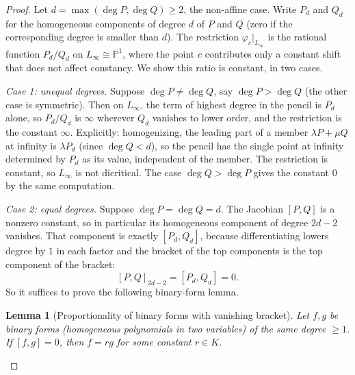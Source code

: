 \documentclass[a4paper,11pt]{article}
\theoremstyle{plain}
\newtheorem{lemma}[theorem]{Lemma}
\theoremstyle{definition}
\theoremstyle{remark}
\begin{document}
\begin{proof}
Let $d = \max(\deg P, \deg Q) \geq 2$, the non-affine case. Write $P_d$ and $Q_d$ for the
homogeneous components of degree $d$ of $P$ and $Q$ (zero if the corresponding degree is
smaller than $d$). The restriction $\varphi_c|_{L_\infty}$ is the rational function
$P_d / Q_d$ on $L_\infty \cong \mathbb{P}^1$, where the point $c$ contributes only a constant
shift that does not affect constancy. We show this ratio is constant, in two cases.

\emph{Case 1: unequal degrees.} Suppose $\deg P \neq \deg Q$, say $\deg P > \deg Q$ (the other
case is symmetric). Then on $L_\infty$, the term of highest degree in the pencil is $P_d$
alone, so $P_d / Q_d$ is $\infty$ wherever $Q_d$ vanishes to lower order, and the restriction
is the constant $\infty$. Explicitly: homogenizing, the leading part of a member
$\lambda P + \mu Q$ at infinity is $\lambda P_d$ (since $\deg Q < d$), so the pencil has the
single point at infinity determined by $P_d$ as its value, independent of the member. The
restriction is constant, so $L_\infty$ is not dicritical. The case $\deg Q > \deg P$ gives
the constant $0$ by the same computation.

\emph{Case 2: equal degrees.} Suppose $\deg P = \deg Q = d$. The Jacobian $[P,Q]$ is a nonzero
constant, so in particular its homogeneous component of degree $2d - 2$ vanishes. That
component is exactly $[P_d, Q_d]$, because differentiating lowers degree by $1$ in each factor
and the bracket of the top components is the top component of the bracket:
\begin{equation}\label{eq:top-bracket}
[P,Q]_{2d-2} = [P_d, Q_d] = 0.
\end{equation}
So it suffices to prove the following binary-form lemma.

\begin{lemma}[Proportionality of binary forms with vanishing bracket]\label{lem:binary}
Let $f, g$ be binary forms (homogeneous polynomials in two variables) of the same degree
$\geq 1$. If $[f,g] = 0$, then $f = r g$ for some constant $r \in K$.
\end{lemma}


\end{proof}
\end{document}
